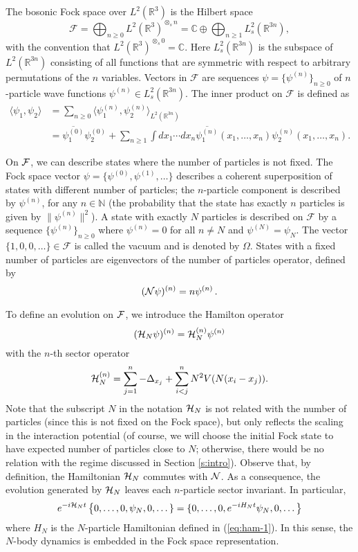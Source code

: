 \documentclass[11pt,a4paper]{article}
\newcommand{\bN}{{\mathbb N}}
\newcommand{\cF}{{\cal F}}
\newcommand{\cH}{{\cal H}}
\newcommand{\cN}{{\cal N}}
\newcommand{\R}{\mathbb{R}}
\begin{document}
The bosonic Fock space over $L^2(\R^3)$ is the Hilbert space
\[
  \mathcal{F} = \bigoplus_{n \ge 0} L^2(\R^3)^{\otimes_s n} = \mathbb{C}
  \oplus \bigoplus_{n \ge 1} L^2_s(\R^{3n}),
\]
with the convention that $L^2(\R^3)^{\otimes_s 0} = \mathbb{C}$. Here
$L^2_s (\R^{3n})$ is the subspace of $L^2(\R^{3n})$ consisting of all functions
that are symmetric with respect to arbitrary permutations of the $n$
variables. Vectors in $\mathcal{F}$ are sequences $\psi = \{\psi^{(n)}\}_{n
\ge 0}$ of $n$-particle wave functions $\psi^{(n)} \in L^2_s(\R^{3n})$. The
inner product on $\mathcal{F}$ is defined as
\begin{align*}
  \langle \psi_1, \psi_2 \rangle & = \sum_{n \ge 0} \langle \psi_1^{(n)},
  \psi_2^{(n)} \rangle_{L^2(\R^{3n})} \\
  & = \overline{\psi_1^{(0)}} \psi_2^{(0)} + \sum_{n \ge 1} \int dx_1 \cdots
  dx_n \overline{\psi_1^{(n)}}(x_1, \dots, x_n) \psi_2^{(n)}(x_1, \dots, x_n).
\end{align*}

On $\cF$, we can describe states where the number of particles is not fixed.
The Fock space vector $\psi = \{ \psi^{(0)}, \psi^{(1)}, \dots  \}$
describes a coherent superposition of states with different number of
particles; the $n$-particle component is described by $\psi^{(n)}$, for any
$n \in \bN$ (the probability that the state has exactly $n$ particles is
given by $\| \psi^{(n)} \|^2$).  A state with exactly $N$ particles is
described on $\mathcal{F}$ by a sequence $\{\psi^{(n)}\}_{n \ge 0}$ where
$\psi^{(n)} = 0$ for all $n \neq N$ and $\psi^{(N)} = \psi_N$. The vector
$\{1, 0, 0, \dots \} \in \mathcal{F}$ is called the vacuum and is denoted by
$\Omega$. States with a fixed number of particles are eigenvectors of the
number of particles operator, defined by
\[ (\cN \psi)^{(n)} = n \psi^{(n)} \, . \]

To define an evolution on $\cF$, we introduce the Hamilton operator 
\[ (\cH_N \psi)^{(n)} = \cH_N^{(n)} \psi^{(n)} \]
with the $n$-th sector operator 
\[ \cH_N^{(n)} = \sum_{j=1}^n -\Delta_{x_j} + \sum_{i<j}^n N^2 V(N (x_i - x_j)). \]
Note that the subscript $N$ in the notation $\cH_N$ is not related with the number of particles (since this is not fixed on the Fock space), but only reflects the scaling in the interaction potential (of course, we will choose the initial Fock state to have expected number of particles close to $N$; otherwise, there would be no relation with the regime discussed in Section \ref{s:intro}). Observe that, by definition, the Hamiltonian $\cH_N$ commutes with $\cN$. As a consequence, the evolution generated by $\cH_N$ leaves each $n$-particle sector invariant. In particular, 
\[ e^{-i\cH_N t}  \left\{ 0, \dots , 0, \psi_N , 0 ,\dots \} = \{ 0, \dots, 0, e^{-iH_N t} \psi_N , 0 ,\dots \right\} \]
where $H_N$ is the $N$-particle Hamiltonian defined in (\ref{eq:ham-1}). In this sense, the $N$-body dynamics is embedded in the Fock space representation. 
\end{document}

